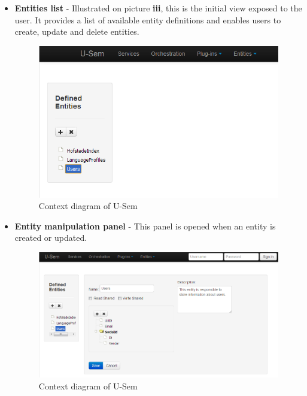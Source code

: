 \documentclass[a4paper, notitlepage]{article}
\begin{document}
	\begin{itemize}
	
		\item \textbf{Entities list} - Illustrated on picture \textbf{iii}, this is the initial view exposed to the user. It provides a list of available entity definitions and enables users to create, update and delete entities.
		
\begin{figure}[h!]
  \centering
  	\includegraphics[scale=0.5]{ui/entityList.png}
  \caption{Context diagram of U-Sem }
  \label{fig_context}
\end{figure}
		
		\item \textbf{Entity manipulation panel} - This panel is opened when an entity is created or updated.
		
\begin{figure}[h!]
  \centering
  	\includegraphics[scale=0.5]{ui/entityPanel.png}
  \caption{Context diagram of U-Sem }
  \label{fig_context}
\end{figure}

	\end{itemize}
\end{document}
